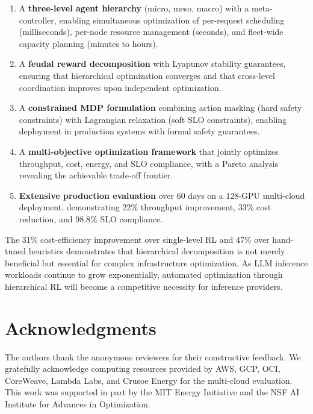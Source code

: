 \documentclass[conference,10pt]{IEEEtran}
\begin{document}
\begin{enumerate}
\item A \textbf{three-level agent hierarchy} (micro, meso, macro) with a meta-controller, enabling simultaneous optimization of per-request scheduling (milliseconds), per-node resource management (seconds), and fleet-wide capacity planning (minutes to hours).

\item A \textbf{feudal reward decomposition} with Lyapunov stability guarantees, ensuring that hierarchical optimization converges and that cross-level coordination improves upon independent optimization.

\item A \textbf{constrained MDP formulation} combining action masking (hard safety constraints) with Lagrangian relaxation (soft SLO constraints), enabling deployment in production systems with formal safety guarantees.

\item A \textbf{multi-objective optimization framework} that jointly optimizes throughput, cost, energy, and SLO compliance, with a Pareto analysis revealing the achievable trade-off frontier.

\item \textbf{Extensive production evaluation} over 60 days on a 128-GPU multi-cloud deployment, demonstrating 22\% throughput improvement, 33\% cost reduction, and 98.8\% SLO compliance.
\end{enumerate}

The 31\% cost-efficiency improvement over single-level RL and 47\% over hand-tuned heuristics demonstrates that hierarchical decomposition is not merely beneficial but essential for complex infrastructure optimization. As LLM inference workloads continue to grow exponentially, automated optimization through hierarchical RL will become a competitive necessity for inference providers.

\section*{Acknowledgments}
The authors thank the anonymous reviewers for their constructive feedback. We gratefully acknowledge computing resources provided by AWS, GCP, OCI, CoreWeave, Lambda Labs, and Crusoe Energy for the multi-cloud evaluation. This work was supported in part by the MIT Energy Initiative and the NSF AI Institute for Advances in Optimization.



\end{document}
